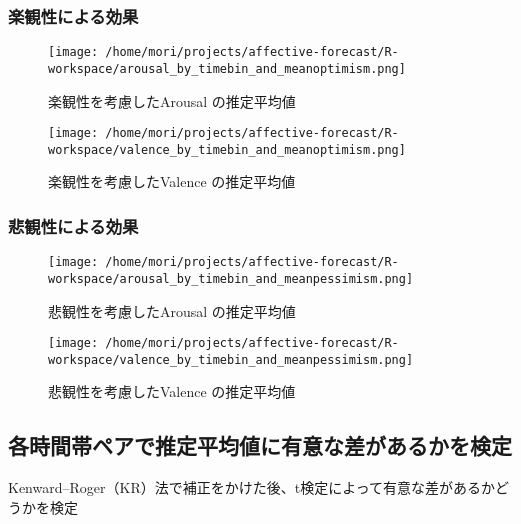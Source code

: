 \documentclass[a4paper,11pt]{article}
\begin{document}
\vspace{3ex}
\subsubsection*{楽観性による効果}
\begin{figure}[H]
  \centering
  \begin{minipage}{0.4\columnwidth}
     \centering
     \texttt{[image: /home/mori/projects/affective-forecast/R-workspace/arousal\_by\_timebin\_and\_meanoptimism.png]}
     \caption{楽観性を考慮したArousal の推定平均値}
  \end{minipage}
%
  \begin{minipage}{0.4\columnwidth}
     \centering
     \texttt{[image: /home/mori/projects/affective-forecast/R-workspace/valence\_by\_timebin\_and\_meanoptimism.png]}
     \caption{楽観性を考慮したValence の推定平均値}
  \end{minipage}
\end{figure}

\vspace{3ex}
\subsubsection*{悲観性による効果}
\begin{figure}[H]
  \centering
  \begin{minipage}{0.4\columnwidth}
     \centering
     \texttt{[image: /home/mori/projects/affective-forecast/R-workspace/arousal\_by\_timebin\_and\_meanpessimism.png]}
     \caption{悲観性を考慮したArousal の推定平均値}
  \end{minipage}
%
  \begin{minipage}{0.4\columnwidth}
     \centering
     \texttt{[image: /home/mori/projects/affective-forecast/R-workspace/valence\_by\_timebin\_and\_meanpessimism.png]}
     \caption{悲観性を考慮したValence の推定平均値}
  \end{minipage}
\end{figure}


\subsection*{各時間帯ペアで推定平均値に有意な差があるかを検定}
Kenward–Roger（KR）法で補正をかけた後、t検定によって有意な差があるかどうかを検定
\end{document}
